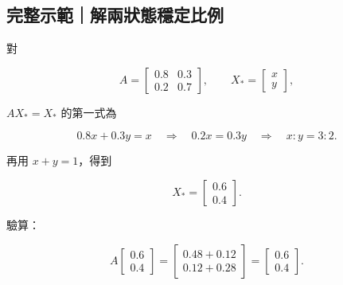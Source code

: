 \documentclass[11pt,a4paper]{article}
\begin{document}
\begin{HandoutWorkedExample}

\subsection{完整示範｜解兩狀態穩定比例}\label{ux5b8cux6574ux793aux7bc4ux89e3ux5169ux72c0ux614bux7a69ux5b9aux6bd4ux4f8b}

對

\[
A=
\begin{bmatrix}
0.8&0.3\\
0.2&0.7
\end{bmatrix},
\qquad
X_*=\begin{bmatrix}x\\y\end{bmatrix},
\]

\(AX_*=X_*\) 的第一式為

\[
0.8x+0.3y=x
\quad\Longrightarrow\quad
0.2x=0.3y
\quad\Longrightarrow\quad
x:y=3:2.
\]

再用 \(x+y=1\)，得到

\[
\boxed{X_*=\begin{bmatrix}0.6\\0.4\end{bmatrix}}.
\]

驗算：

\[
A\begin{bmatrix}0.6\\0.4\end{bmatrix}
=
\begin{bmatrix}0.48+0.12\\0.12+0.28\end{bmatrix}
=
\begin{bmatrix}0.6\\0.4\end{bmatrix}.
\]

\end{HandoutWorkedExample}
\end{document}
